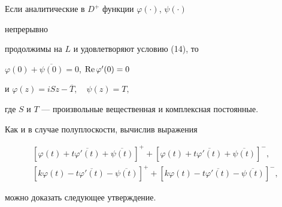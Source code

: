\begin{cor}


Если аналитические в $D^+$ функции $\varphi(\cdot)$, $\psi(\cdot)$


непрерывно


продолжимы на $L$ и удовлетворяют условию (14), то


$\varphi(0)+\overline{\psi(0)}=0$, $\operatorname{Re}\varphi'(0)=0$


и $\varphi(z)=iSz-\overline{T},\quad \psi(z)=T,$


где $S$ и $T$ --- произвольные вещественная и комплексная постоянные.


\end{cor}





Как и в случае полуплоскости, вычислив выражения


\begin{gather*}


[\varphi(t)+t\overline{\varphi'(t)}+\overline{\psi(t)}]^+


+ [\varphi(t)+t\overline{\varphi'(t)}+\overline{\psi(t)}]^-, \\


%


[k\varphi(t)-t\overline{\varphi'(t)}-\overline{\psi(t)}]^+


+ [k\varphi(t)-t\overline{\varphi'(t)}-\overline{\psi(t)}]^-,


\end{gather*}


можно доказать следующее утверждение.





